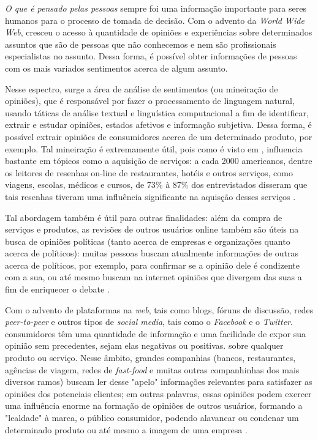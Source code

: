 \textit{O que é pensado pelas pessoas} sempre foi uma informação importante para seres humanos para o processo de tomada de decisão. Com o advento da \emph{World Wide Web}, cresceu o acesso à quantidade de opiniões e experiências sobre determinados assuntos que são de pessoas que não conhecemos e nem são profissionais especialistas no assunto. Dessa forma, é possível obter informações de pessoas com os mais variados sentimentos acerca de algum assunto.

Nesse espectro, surge a área de análise de sentimentos (ou mineiração de opiniões), que é responsável por fazer o processamento de linguagem natural, usando táticas de análise textual e linguística computacional a fim de identificar, extrair e estudar opiniões, estados afetivos e informação subjetiva. Dessa forma, é possível extrair opiniões de consumidores acerca de um determinado produto, por exemplo. Tal mineiração é extremamente útil, pois como é visto em  \cite{pang2008opinion}, influencia bastante em tópicos como a aquisição de serviços: a cada 2000 americanos, dentre os leitores de resenhas on-line de restaurantes, hotéis e outros serviços, como viagens, escolas, médicos e cursos, de 73\% à 87\% dos entrevistados disseram que tais resenhas tiveram uma influência significante na aquisção desses serviços \cite{zhu2010impact}.

Tal abordagem também é útil para outras finalidades: além da compra de serviços e produtos, as revisões de outros usuários online também são úteis na busca de opiniões políticas (tanto acerca de empresas e organizações quanto acerca de políticos): muitas pessoas buscam atualmente informações de outras acerca de políticos, por exemplo, para confirmar se a opinião dele é condizente com a sua, ou até mesmo buscam na internet opiniões que divergem das suas a fim de enriquecer o debate \cite{gil2009weblogs}.

Com o advento de plataformas na \emph{web}, tais como blogs, fóruns de discussão, redes \emph{peer-to-peer} e outros tipos de \emph{social media}, tais como o \emph{Facebook} e o \emph{Twitter}. consumidores têm uma quantidade de informação e uma facilidade de expor sua opinião sem precedentes, sejam elas negativas ou positivas. sobre qualquer produto ou serviço. Nesse âmbito, grandes companhias (bancos, restaurantes, agências de viagem, redes de \emph{fast-food} e muitas outras companhinhas dos mais diversos ramos) buscam ler desse "apelo" informações relevantes para satisfazer as opiniões dos potenciais clientes; em outras palavras, essas opiniões podem exercer uma influência enorme na formação de opiniões de outros usuários, formando a "lealdade" à marca, o público consumidor, podendo alavancar ou condenar um determinado produto ou até mesmo a imagem de uma empresa \cite{hoffman2008online}.

